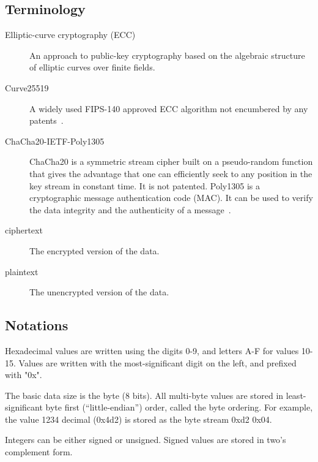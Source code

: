 \subsection{Terminology}

\begin{description}
\item[Elliptic-curve cryptography (ECC)] %
  An approach to public-key cryptography based on the algebraic structure of elliptic curves over finite fields.
\item[Curve25519] %
  A widely used FIPS-140 approved ECC algorithm not encumbered by any patents~\cite{RFC7748}.
\item[ChaCha20-IETF-Poly1305] %
  ChaCha20 is a symmetric stream cipher built on a pseudo-random function that gives the advantage that one can efficiently seek to any position in the key stream in constant time.
  It is not patented.
  Poly1305 is a cryptographic message authentication code (MAC).
  It can be used to verify the data integrity and the authenticity of a message~\cite{RFC8439}.
\item[ciphertext] %
  The encrypted version of the data.
\item[plaintext] %
  The unencrypted version of the data.
\end{description}

\subsection{Notations}

Hexadecimal values are written using the digits 0-9, and letters A-F for values 10-15.
%
Values are written with the most-significant digit on the left, and prefixed with "0x".

The basic data size is the byte (8 bits).
%
All multi-byte values are stored in least-significant byte first (``little-endian'') order, called the byte ordering.
%
For example, the value 1234 decimal (0x4d2) is stored as the byte stream 0xd2 0x04.

Integers can be either signed or unsigned.
%
Signed values are stored in two's complement form.

